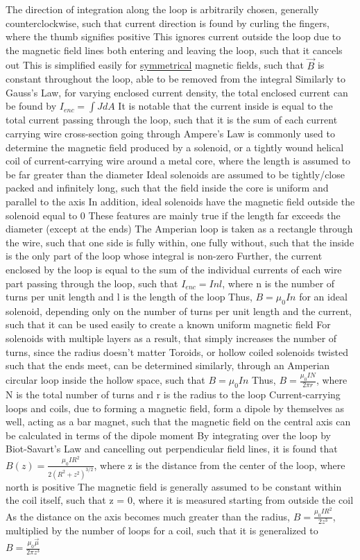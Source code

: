 \documentclass[11 pt, twoside]{article}
\newenvironment{outline*}
{
	\begin{outline}[enumerate]
	}
	{\end{outline}
}
\begin{document}
\begin{outline*}
\2 The direction of integration along the loop is arbitrarily chosen, generally counterclockwise, such that current direction is found by curling the fingers, where the thumb signifies positive
\2 This ignores current outside the loop due to the magnetic field lines both entering and leaving the loop, such that it cancels out
\2 This is simplified easily for \underline{symmetrical} magnetic fields, such that $\vec{B}$ is constant throughout the loop, able to be removed from the integral
\2 Similarly to Gauss's Law, for varying enclosed current density, the total enclosed current can be found by $I_{enc} = \int JdA$
\2 It is notable that the current inside is equal to the total current passing through the loop, such that it is the sum of each current carrying wire cross-section going through
\2 Ampere's Law is commonly used to determine the magnetic field produced by a solenoid, or a tightly wound helical coil of current-carrying wire around a metal core, where the length is assumed to be far greater than the diameter
\3 Ideal solenoids are assumed to be tightly/close packed and infinitely long, such that the field inside the core is uniform and parallel to the axis
\4 In addition, ideal solenoids have the magnetic field outside the solenoid equal to 0
\4 These features are mainly true if the length far exceeds the diameter (except at the ends)
\3 The Amperian loop is taken as a rectangle through the wire, such that one side is fully within, one fully without, such that the inside is the only part of the loop whose integral is non-zero
\4 Further, the current enclosed by the loop is equal to the sum of the individual currents of each wire part passing through the loop, such that $I_{enc} = Inl$, where n is the number of turns per unit length and l is the length of the loop
\4 Thus, $B = \mu_0In$ for an ideal solenoid, depending only on the number of turns per unit length and the current, such that it can be used easily to create a known uniform magnetic field
\4 For solenoids with multiple layers as a result, that simply increases the number of turns, since the radius doesn't matter
\3 Toroids, or hollow coiled solenoids twisted such that the ends meet, can be determined similarly, through an Amperian circular loop inside the hollow space, such that $B = \mu_0In$
\4 Thus, $B = \frac{\mu_0IN}{2\pi r}$, where N is the total number of turns and r is the radius to the loop
\1 Current-carrying loops and coils, due to forming a magnetic field, form a dipole by themselves as well, acting as a bar magnet, such that the magnetic field on the central axis can be calculated in terms of the dipole moment
\2 By integrating over the loop by Biot-Savart's Law and cancelling out perpendicular field lines, it is found that $B(z) = \frac{\mu_0IR^2}{2(R^2 + z^2)^{3/2}}$, where z is the distance from the center of the loop, where north is positive
\3 The magnetic field is generally assumed to be constant within the coil itself, such that z = 0, where it is measured starting from outside the coil
\2 As the distance on the axis becomes much greater than the radius, $B = \frac{\mu_0IR^2}{2z^3}$, multiplied by the number of loops for a coil, such that it is generalized to $B = \frac{\mu_0\vec{\mu}}{2\pi z^3}$
\end{outline*}
\end{document}
